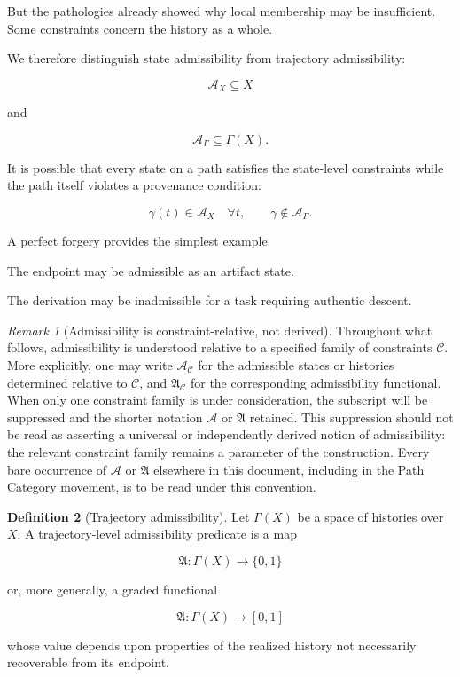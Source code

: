 \documentclass[
  11pt,
  a4paper,
  DIV=12,
  BCOR=0mm,
  parskip=half-
]{scrartcl}
\theoremstyle{definition}
\newtheorem{definition}{Definition}[section]
\theoremstyle{plain}
\theoremstyle{remark}
\newtheorem{remark}[definition]{Remark}
\begin{document}
But the pathologies already showed why local membership may be insufficient.
Some constraints concern the history as a whole.

We therefore distinguish state admissibility from trajectory admissibility:

\[
  \mathcal A_X
  \subseteq
  X
\]

and

\[
  \mathcal A_\Gamma
  \subseteq
  \Gamma(X).
\]

It is possible that every state on a path satisfies the state-level
constraints while the path itself violates a provenance condition:

\[
  \gamma(t)\in\mathcal A_X
  \quad\forall t,
  \qquad
  \gamma\notin\mathcal A_\Gamma.
\]

A perfect forgery provides the simplest example.

The endpoint may be admissible as an artifact state.

The derivation may be inadmissible for a task requiring authentic descent.

\begin{remark}[Admissibility is constraint-relative, not derived]
\label{rem:admissibility-relativity}
Throughout what follows, admissibility is understood relative to a specified
family of constraints \(\mathcal C\). More explicitly, one may write
\(\mathcal A_{\mathcal C}\) for the admissible states or histories determined
relative to \(\mathcal C\), and \(\mathfrak A_{\mathcal C}\) for the
corresponding admissibility functional. When only one constraint family is
under consideration, the subscript will be suppressed and the shorter
notation \(\mathcal A\) or \(\mathfrak A\) retained. This suppression should
not be read as asserting a universal or independently derived notion of
admissibility: the relevant constraint family remains a parameter of the
construction. Every bare occurrence of \(\mathcal A\) or \(\mathfrak A\)
elsewhere in this document, including in the Path Category movement, is to
be read under this convention.
\end{remark}

\begin{definition}[Trajectory admissibility]
\label{def:trajectory-admissibility}
Let \(\Gamma(X)\) be a space of histories over \(X\). A trajectory-level
admissibility predicate is a map

\[
  \mathfrak A:\Gamma(X)\rightarrow\{0,1\}
\]

or, more generally, a graded functional

\[
  \mathfrak A:\Gamma(X)\rightarrow[0,1]
\]

whose value depends upon properties of the realized history not necessarily
recoverable from its endpoint.
\end{definition}
\end{document}
